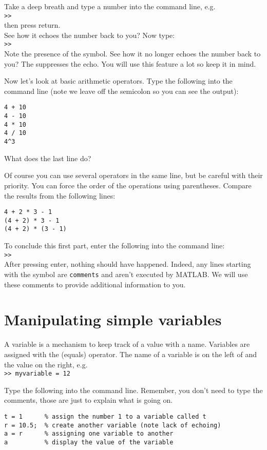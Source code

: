 \documentclass{article}
\begin{document}
Take a deep breath and type a number into the command line, e.g. \\
\verb|>>|  \\
then press return. \\
See how it echoes the number back to you? Now type: \\
\verb|>>|  \\
Note the presence of the \mcode{;} symbol.
See how it no longer echoes the number back to you?
The \mcode{;} suppresses the echo.
You will use this feature a lot so keep it in mind.


Now let's look at basic arithmetic operators. 
Type the following into the command line (note we leave off the semicolon so you can see the output):
\begin{lstlisting}
4 + 10
4 - 10
4 * 10
4 / 10
4^3
\end{lstlisting}
What does the last line  do?

Of course you can use several operators in the same line, but be careful with their priority.
You can force the order of the operations using parentheses.
Compare the results from the following lines:
\begin{lstlisting}
4 + 2 * 3 - 1
(4 + 2) * 3 - 1
(4 + 2) * (3 - 1)
\end{lstlisting}

To conclude this first part, enter the following into the command line: \\
\verb|>>|  \\
After pressing enter, nothing should have happened.
Indeed, any lines starting with the \mcode{\%} symbol are \verb|comments| and aren't executed by MATLAB.
We will use these comments to provide additional information to you.


\section{Manipulating simple variables}

A variable is a mechanism to keep track of a value with a name.
Variables are assigned with the \mcode{=} (equals) operator.
The name of a variable is on the left of \mcode{=} and the value on the right, e.g.\\
\verb|>> myvariable = 12|

Type the following into the command line.
Remember, you don't need to type the comments, those are just to explain what is going on.
\begin{lstlisting}
t = 1      % assign the number 1 to a variable called t
r = 10.5;  % create another variable (note lack of echoing)
a = r      % assigning one variable to another
a          % display the value of the variable
\end{lstlisting}
\end{document}
